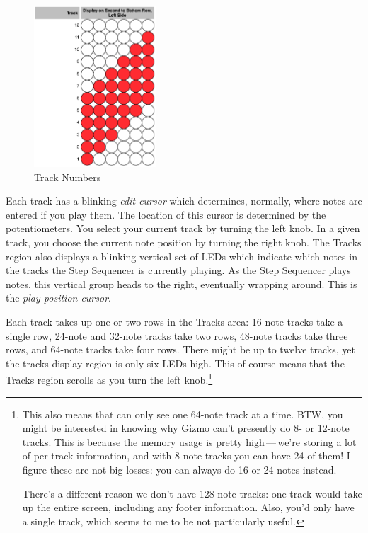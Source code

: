 \documentclass{article}
\begin{document}
\begin{figure}
\includegraphics[width=1.8in]{track.pdf}
\vspace{-2em}\caption{\small Track Numbers}
\label{tracknumber}
\end{figure}

Each track has a blinking {\it edit cursor} which determines, normally, where notes are entered if you play them.  The location of this cursor is determined by the potentiometers.  You select your current track by turning the left knob.  In a given track, you choose the current note position by turning the right knob.  The Tracks region also displays a blinking vertical set of LEDs which indicate which notes in the tracks the Step Sequencer is currently playing.  As the Step Sequencer plays notes, this vertical group heads to the right, eventually wrapping around.  This is the {\it play position cursor}.

Each track takes up one or two rows in the Tracks area: 16-note tracks take a single row, 24-note and 32-note tracks take two rows, 48-note tracks take three rows, and 64-note tracks take four rows.    There might be up to twelve tracks, yet the tracks display region is only six LEDs high.  This of course means that  the Tracks region scrolls as you turn the left knob.\footnote{This also means that can only see one 64-note track at a time.  BTW, you might be interested in knowing why Gizmo can't presently do 8- or 12-note tracks.  This is because the memory usage is pretty high\,---\,we're storing a lot of per-track information, and with 8-note tracks you can have 24 of them!  I figure these are not big losses: you can always do 16 or 24 notes instead.  

There's a different reason we don't have 128-note tracks: one track would take up the entire screen, including any footer information.  Also, you'd only have a single track, which seems to me to be not particularly useful.}
\end{document}
